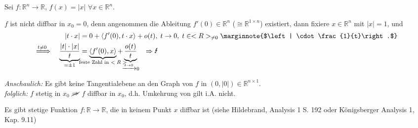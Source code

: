\begin{example}[Betragsfunktion]
	Sei $f:\mathbb{R}^n\to \mathbb{R}$, $f(x) = \vert x \vert$ $\forall x\in\mathbb{R}^n$.
	
	$f$ ist nicht \gls{diffbar} in $x_0=0$, denn angenommen die Ableitung $f'(0)\in\mathbb{R}^n$ ($\cong \mathbb{R}^{1 \times n}$) existiert, dann fixiere $x\in\mathbb{R}^n$ mit $\vert x \vert = 1$, und
	\begin{alignat*}{2}
		&& \vert t\cdot x\vert &= 0 + \langle f'(0), t\cdot x \rangle + o(t),\;t\to 0,\; t\in\mathbb{R}_{\neq 0} \marginnote{$\left| \cdot \frac{1}{t}\right.$} \\
		\xRightarrow{t\neq 0}\;&& \underbrace{\frac{\vert t \vert \cdot \vert x \vert}{t}}_{=\pm 1} &= \underbrace{\langle f'(0), x\rangle}_{\mathclap{\text{feste Zahl in $\mathbb{R}$}}} + \underbrace{\frac{o(t)}{t}}_{\mathclap{\xrightarrow{t\to 0}0}} \quad\Rightarrow \text{\Lightning}
	\end{alignat*}
	
	\emph{Anschaulich:} Es gibt keine Tangentialebene an den Graph von $f$ in $(0, \vert 0 \vert )\in\mathbb{R}^{n\times 1}$.\\
	\emph{folglich:} $f$ stetig in $x_0$ $\cancel{\Rightarrow}$ $f$ \gls{diffbar} in $x_0$, d.h. Umkehrung von  gilt i.A. nicht.
	
	\begin{hint}
		Es gibt stetige Funktion $f:\mathbb{R}\to \mathbb{R}$, die in keinem Punkt $x$ \gls{diffbar} ist (siehe Hildebrand, Analysis 1 S. 192 oder Königsberger Analysis 1, Kap. 9.11)
	\end{hint}

	\begin{center}\end{center}
\end{example}

